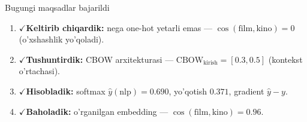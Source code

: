 \documentclass[aspectratio=169,11pt]{beamer}
\newcommand{\bajarildi}{{\color{deepgreen}\large$\checkmark$}\;}
\begin{document}
\begin{frame}{Bugungi maqsadlar bajarildi}
  \begin{enumerate}\setlength\itemsep{7pt}
    \item \bajarildi \textbf{Keltirib chiqardik:} nega one-hot yetarli emas ---
          $\cos(\text{film},\text{kino})=0$ (o'xshashlik yo'qoladi).
    \item \bajarildi \textbf{Tushuntirdik:} CBOW arxitekturasi ---
          $\text{CBOW}_{\text{kirish}}=[0.3,0.5]$ (kontekst o'rtachasi).
    \item \bajarildi \textbf{Hisobladik:} softmax $\hat{y}(\text{nlp})=0.690$,
          yo'qotish $0.371$, gradient $\hat{y}-y$.
    \item \bajarildi \textbf{Baholadik:} o'rganilgan embedding ---
          $\cos(\text{film},\text{kino})=0.96$.
  \end{enumerate}
\end{frame}
\end{document}
